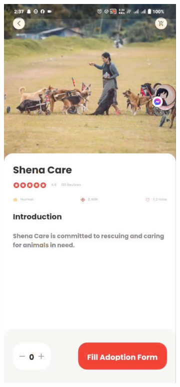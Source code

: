 \begin{figure}[H]
  \medskip
      \begin{subfigure}{0.32\textwidth}
    \includegraphics[width=\linewidth]{img/UI2.jpg}

\end{subfigure}
\end{figure}

